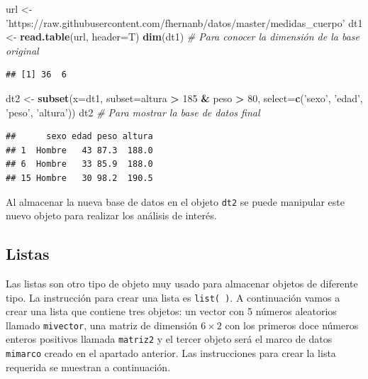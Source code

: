 \documentclass[10pt,]{krantz}
\makeatletter
\newenvironment{Shaded}{\begin{snugshade}}{\end{snugshade}}
\newcommand{\KeywordTok}[1]{\textcolor[rgb]{0.13,0.29,0.53}{\textbf{#1}}}
\newcommand{\DataTypeTok}[1]{\textcolor[rgb]{0.13,0.29,0.53}{#1}}
\newcommand{\DecValTok}[1]{\textcolor[rgb]{0.00,0.00,0.81}{#1}}
\newcommand{\StringTok}[1]{\textcolor[rgb]{0.31,0.60,0.02}{#1}}
\newcommand{\CommentTok}[1]{\textcolor[rgb]{0.56,0.35,0.01}{\textit{#1}}}
\newcommand{\OperatorTok}[1]{\textcolor[rgb]{0.81,0.36,0.00}{\textbf{#1}}}
\newcommand{\NormalTok}[1]{#1}
\newenvironment{kframe}{%
\medskip{}
\setlength{\fboxsep}{.8em}
 \def\at@end@of@kframe{}%
 \ifinner\ifhmode%
  \def\at@end@of@kframe{\end{minipage}}%
  \begin{minipage}{\columnwidth}%
 \fi\fi%
 \def\FrameCommand##1{\hskip\@totalleftmargin \hskip-\fboxsep
 \colorbox{shadecolor}{##1}\hskip-\fboxsep
     \hskip-\linewidth \hskip-\@totalleftmargin \hskip\columnwidth}%
 \MakeFramed {\advance\hsize-\width
   \@totalleftmargin\z@ \linewidth\hsize
   \@setminipage}}%
 {\par\unskip\endMakeFramed%
 \at@end@of@kframe}
\renewenvironment{Shaded}{\begin{kframe}}{\end{kframe}}
\makeatother
\begin{document}
\begin{Shaded}
\begin{Highlighting}[]
\NormalTok{url <-}\StringTok{ 'https://raw.githubusercontent.com/fhernanb/datos/master/medidas_cuerpo'}
\NormalTok{dt1 <-}\StringTok{ }\KeywordTok{read.table}\NormalTok{(url, }\DataTypeTok{header=}\NormalTok{T)}
\KeywordTok{dim}\NormalTok{(dt1)  }\CommentTok{# Para conocer la dimensión de la base original}
\end{Highlighting}
\end{Shaded}

\begin{verbatim}
## [1] 36  6
\end{verbatim}

\begin{Shaded}
\begin{Highlighting}[]
\NormalTok{dt2 <-}\StringTok{ }\KeywordTok{subset}\NormalTok{(}\DataTypeTok{x=}\NormalTok{dt1, }\DataTypeTok{subset=}\NormalTok{altura }\OperatorTok{>}\StringTok{ }\DecValTok{185} \OperatorTok{&}\StringTok{ }\NormalTok{peso }\OperatorTok{>}\StringTok{ }\DecValTok{80}\NormalTok{,}
              \DataTypeTok{select=}\KeywordTok{c}\NormalTok{(}\StringTok{'sexo'}\NormalTok{, }\StringTok{'edad'}\NormalTok{, }\StringTok{'peso'}\NormalTok{, }\StringTok{'altura'}\NormalTok{))}
\NormalTok{dt2  }\CommentTok{# Para mostrar la base de datos final}
\end{Highlighting}
\end{Shaded}

\begin{verbatim}
##      sexo edad peso altura
## 1  Hombre   43 87.3  188.0
## 6  Hombre   33 85.9  188.0
## 15 Hombre   30 98.2  190.5
\end{verbatim}

Al almacenar la nueva base de datos en el objeto \texttt{dt2} se puede
manipular este nuevo objeto para realizar los análisis de interés.

\subsection{\texorpdfstring{Listas 
}{Listas  }}\label{listas}

Las listas son otro tipo de objeto muy usado para almacenar objetos de
diferente tipo. La instrucción para crear una lista es
\texttt{list(\ )}. A continuación vamos a crear una lista que contiene
tres objetos: un vector con 5 números aleatorios llamado
\texttt{mivector}, una matriz de dimensión \(6 \times 2\) con los
primeros doce números enteros positivos llamada \texttt{matriz2} y el
tercer objeto será el marco de datos \texttt{mimarco} creado en el
apartado anterior. Las instrucciones para crear la lista requerida se
muestran a continuación.
\end{document}
